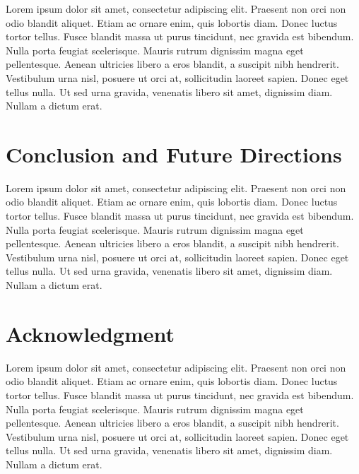 \documentclass[conference]{IEEEtran}
\begin{document}
Lorem ipsum dolor sit amet, consectetur adipiscing elit. Praesent non orci non odio blandit aliquet. Etiam ac ornare enim, quis lobortis diam. Donec luctus tortor tellus. Fusce blandit massa ut purus tincidunt, nec gravida est bibendum. Nulla porta feugiat scelerisque. Mauris rutrum dignissim magna eget pellentesque. Aenean ultricies libero a eros blandit, a suscipit nibh hendrerit. Vestibulum urna nisl, posuere ut orci at, sollicitudin laoreet sapien. Donec eget tellus nulla. Ut sed urna gravida, venenatis libero sit amet, dignissim diam. Nullam a dictum erat.

\section{Conclusion and Future Directions}

Lorem ipsum dolor sit amet, consectetur adipiscing elit. Praesent non orci non odio blandit aliquet. Etiam ac ornare enim, quis lobortis diam. Donec luctus tortor tellus. Fusce blandit massa ut purus tincidunt, nec gravida est bibendum. Nulla porta feugiat scelerisque. Mauris rutrum dignissim magna eget pellentesque. Aenean ultricies libero a eros blandit, a suscipit nibh hendrerit. Vestibulum urna nisl, posuere ut orci at, sollicitudin laoreet sapien. Donec eget tellus nulla. Ut sed urna gravida, venenatis libero sit amet, dignissim diam. Nullam a dictum erat.

\section*{Acknowledgment}

Lorem ipsum dolor sit amet, consectetur adipiscing elit. Praesent non orci non odio blandit aliquet. Etiam ac ornare enim, quis lobortis diam. Donec luctus tortor tellus. Fusce blandit massa ut purus tincidunt, nec gravida est bibendum. Nulla porta feugiat scelerisque. Mauris rutrum dignissim magna eget pellentesque. Aenean ultricies libero a eros blandit, a suscipit nibh hendrerit. Vestibulum urna nisl, posuere ut orci at, sollicitudin laoreet sapien. Donec eget tellus nulla. Ut sed urna gravida, venenatis libero sit amet, dignissim diam. Nullam a dictum erat.



\end{document}
